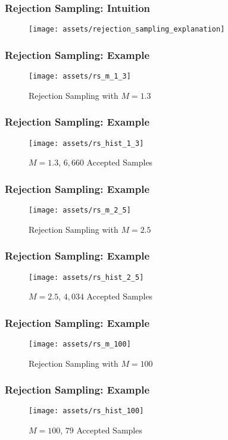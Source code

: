 \documentclass{beamer}
\begin{document}
\begin{frame}
  \frametitle{Rejection Sampling: Intuition}
  \begin{figure}
    \centering
    \texttt{[image: assets/rejection\_sampling\_explanation]}
  \end{figure}
\end{frame}


\begin{frame}
  \frametitle{Rejection Sampling: Example}
  \begin{figure}
    \centering
    \texttt{[image: assets/rs\_m\_1\_3]}
    \caption{Rejection Sampling with $M = 1.3$}
  \end{figure}
\end{frame}

\begin{frame}
  \frametitle{Rejection Sampling: Example}
  \begin{figure}
    \centering
    \texttt{[image: assets/rs\_hist\_1\_3]}
    \caption{$M = 1.3$, $6,660$ Accepted Samples}
  \end{figure}
\end{frame}

\begin{frame}
  \frametitle{Rejection Sampling: Example}
  \begin{figure}
    \centering
    \texttt{[image: assets/rs\_m\_2\_5]}
    \caption{Rejection Sampling with $M = 2.5$}
  \end{figure}
\end{frame}

\begin{frame}
  \frametitle{Rejection Sampling: Example}
  \begin{figure}
    \centering
    \texttt{[image: assets/rs\_hist\_2\_5]}
    \caption{$M = 2.5$, $4,034$ Accepted Samples}
  \end{figure}
\end{frame}

\begin{frame}
  \frametitle{Rejection Sampling: Example}
  \begin{figure}
    \centering
    \texttt{[image: assets/rs\_m\_100]}
    \caption{Rejection Sampling with $M = 100$}
  \end{figure}
\end{frame}

\begin{frame}
  \frametitle{Rejection Sampling: Example}
  \begin{figure}
    \centering
    \texttt{[image: assets/rs\_hist\_100]}
    \caption{$M = 100$, $79$ Accepted Samples}
  \end{figure}
\end{frame}
\end{document}
